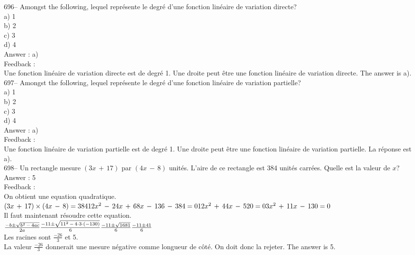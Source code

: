﻿\documentclass[letterpaper, 12pt]{article}
\begin{document}
696-- Amongst the following, lequel repr\'esente le degr\'e d'une
fonction lin\'eaire de variation directe?\\
a) 1\\
b) 2\\
c) 3\\
d) 4\\

Answer : a)\\

Feedback : \\
Une fonction lin\'eaire de variation directe est de degr\'e 1.  Une droite
peut \^etre une fonction lin\'eaire de variation directe.  The answer is
a).\\

697-- Amongst the following, lequel repr\'esente le degr\'e d'une
fonction lin\'eaire de variation partielle?\\
a) 1\\
b) 2\\
c) 3\\
d) 4\\

Answer : a)\\

Feedback : \\
Une fonction lin\'eaire de variation partielle est de degr\'e 1.  Une droite
peut \^etre une fonction lin\'eaire de variation partielle.  La r\'eponse
est a).\\

698-- Un rectangle mesure $(3x\,+\,17)$ par $(4x\,-\,8)$ unit\'es.  L'aire
de ce rectangle est 384 unit\'es carr\'ees.  Quelle est la valeur de $x$?\\

Answer : 5\\

Feedback : \\
On obtient une equation quadratique.  \\
$(3x\,+\,17)\times(4x\,-\,8)=384\\
12x^{2}\,-\,24x\,+\,68x\,-\,136\,-\,384=0\\
12x^{2}\,+\,44x\,-\,520=0\\
3x^{2}\,+\,11x\,-\,130=0$\\
Il faut maintenant r\'esoudre cette equation.\\[2mm]
$\frac{-b\pm\sqrt{b^{2}\,-\,4ac}}{2a}\\[2mm]
\frac{-11\pm \sqrt{11^{2}\,-\,4\cdot3\cdot(-130)}}{6}\\[2mm]
\frac{-11\pm \sqrt{1681}}{6}\\[2mm]
\frac{-11\pm 41}{6}$\\[2mm]
Les racines sont $\frac{-26}{3}$ et 5.\\[2mm]
La valeur $\frac{-26}{3}$ donnerait une mesure n\'egative comme longueur de
c\^ot\'e. On doit donc la rejeter.  The answer is 5.\\
\end{document}

